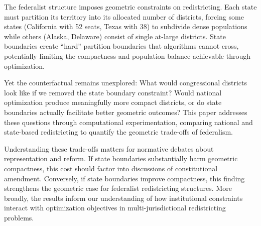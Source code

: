 The federalist structure imposes geometric constraints on redistricting. Each state must partition its territory into its allocated number of districts, forcing some states (California with 52 seats, Texas with 38) to subdivide dense populations while others (Alaska, Delaware) consist of single at-large districts. State boundaries create ``hard'' partition boundaries that algorithms cannot cross, potentially limiting the compactness and population balance achievable through optimization.

Yet the counterfactual remains unexplored: What would congressional districts look like if we removed the state boundary constraint? Would national optimization produce meaningfully more compact districts, or do state boundaries actually facilitate better geometric outcomes? This paper addresses these questions through computational experimentation, comparing national and state-based redistricting to quantify the geometric trade-offs of federalism.

Understanding these trade-offs matters for normative debates about representation and reform. If state boundaries substantially harm geometric compactness, this cost should factor into discussions of constitutional amendment. Conversely, if state boundaries improve compactness, this finding strengthens the geometric case for federalist redistricting structures. More broadly, the results inform our understanding of how institutional constraints interact with optimization objectives in multi-jurisdictional redistricting problems.
